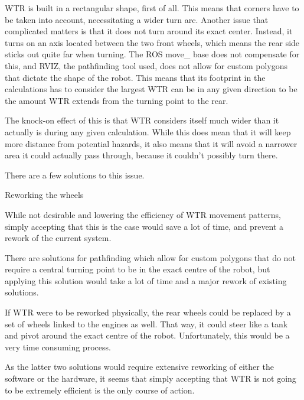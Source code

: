 WTR is built in a rectangular shape, first of all.
This means that corners have to be taken into account, necessitating a wider turn arc.
Another issue that complicated matters is that it does not turn around its exact center.
Instead, it turns on an axis located between the two front wheels, which means the rear side sticks out quite far when turning.
The ROS move\_ base does not compensate for this, and RVIZ, the pathfinding tool used, does not allow for custom polygons that dictate the shape of the robot.
This means that its footprint in the calculations has to consider the largest WTR can be in any given direction to be the amount WTR extends from the turning point to the rear.

The knock-on effect of this is that WTR considers itself much wider than it actually is during any given calculation.
While this does mean that it will keep more distance from potential hazards, it also means that it will avoid a narrower area it could actually pass through, because it couldn't possibly turn there.

There are a few solutions to this issue.
\begin{labeling}{Reworking the wheels}
\item [Accepting it] While not desirable and lowering the efficiency of WTR movement patterns, simply accepting that this is the case would save a lot of time, and prevent a rework of the current system.
\item [Changing Software] There are solutions for pathfinding which allow for custom polygons that do not require a central turning point to be in the exact centre of the robot, but applying this solution would take a lot of time and a major rework of existing solutions.
\item [Reworking the wheels] If WTR were to be reworked physically, the rear wheels could be replaced by a set of wheels linked to the engines as well. That way, it could steer like a tank and pivot around the exact centre of the robot. Unfortunately, this would be a very time consuming process.
\end{labeling}

As the latter two solutions would require extensive reworking of either the software or the hardware, it seems that simply accepting that WTR is not going to be extremely efficient is the only course of action.

\newpage